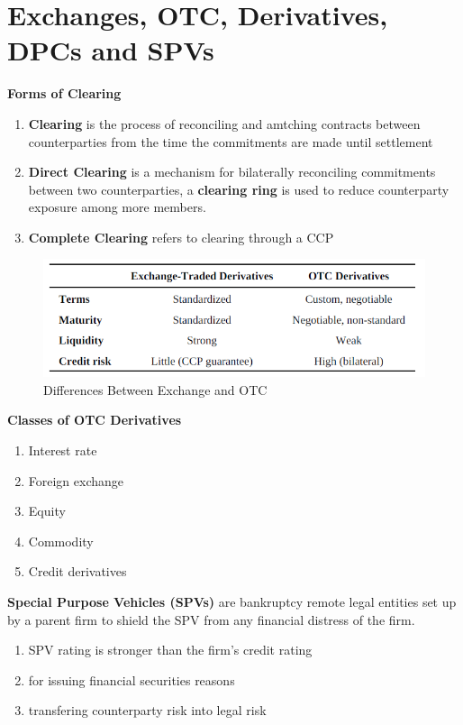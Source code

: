 \documentclass[11pt,fleqn]{report} %
\numberwithin{equation}{section} %
\numberwithin{figure}{section} %
\numberwithin{table}{section} %
\begin{document}
\chapter{Exchanges, OTC, Derivatives, DPCs and SPVs}
 \begin{definition}\textbf{Forms of Clearing}\\
 \begin{enumerate}
     \item \textbf{Clearing} is the process of reconciling and amtching contracts between counterparties from the time the commitments are made until settlement
     \item \textbf{Direct Clearing} is a mechanism for bilaterally reconciling commitments between two counterparties, a \textbf{clearing ring} is used to reduce counterparty exposure among more members.
     \item \textbf{Complete Clearing} refers to clearing through a CCP
 \end{enumerate}
 \end{definition}
 \begin{figure}[h!]
     \centering
     \includegraphics[scale=0.7]{exotc.PNG}
     \caption{Differences Between Exchange and OTC}
 \end{figure}
 \begin{remark}\textbf{Classes of OTC Derivatives}
 \begin{enumerate}
     \item Interest rate
     \item Foreign exchange
     \item Equity
     \item Commodity
     \item Credit derivatives
 \end{enumerate}
 \end{remark}
 \begin{definition}\textbf{Special Purpose Vehicles (SPVs)} are bankruptcy remote legal entities set up by a parent firm to shield the SPV from any financial distress of the firm.
 \begin{enumerate}
     \item SPV rating is stronger than the firm's credit rating
     \item for issuing financial securities reasons
     \item transfering counterparty risk into legal risk
 \end{enumerate}
 \end{definition}
\end{document}
